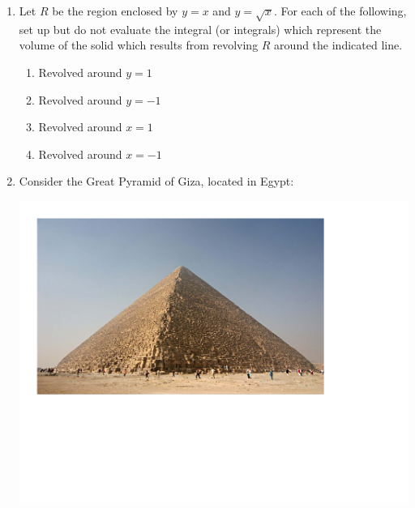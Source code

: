 \documentclass[12pt]{article}
\newif\ifans
\begin{document}
\begin{enumerate}
\begin{enumerate}
\end{enumerate}

\item Let $R$ be the region enclosed by $y=x$ and $y=\sqrt{x}$.  For each of the following, set up but do not evaluate the integral (or integrals) which represent the volume of the solid which results from revolving $R$ around the indicated line.

\begin{enumerate}

\item Revolved around $y=1$

\ifans{\fbox{$\pi \int_0^1 \left((1-x)^2-(1-\sqrt{x})^2\right)\,dx$}} \fi

\item Revolved around $y=-1$

\ifans{\fbox{$\pi \int_0^1 \left((\sqrt{x}+1)^2-(x+1)^2\right)\,dx$}} \fi

\item Revolved around $x=1$

\ifans{\fbox{$\pi \int_0^1 \left((1-y^2)^2-(1-y)^2\right)\,dy$}} \fi

\item Revolved around $x=-1$

\ifans{\fbox{$\pi \int_0^1 \left((1+y)^2-(1+y^2)^2\right)\,dy$}} \fi

\end{enumerate}

\item Consider the Great Pyramid of Giza, located in Egypt:

\begin{center}
\includegraphics[scale=0.5]{giza.pdf}
\end{center}


\end{enumerate}
\end{document}
